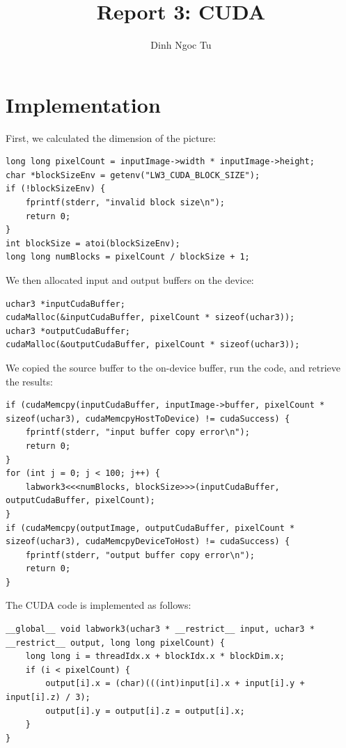 \documentclass[12pt]{article}
\title{Report 3: CUDA}
\author{Dinh Ngoc Tu}
\begin{document}
\maketitle


\section{Implementation}

First, we calculated the dimension of the picture:

\begin{lstlisting}[breaklines]
long long pixelCount = inputImage->width * inputImage->height;
char *blockSizeEnv = getenv("LW3_CUDA_BLOCK_SIZE");
if (!blockSizeEnv) {
    fprintf(stderr, "invalid block size\n");
    return 0;
}
int blockSize = atoi(blockSizeEnv);
long long numBlocks = pixelCount / blockSize + 1;
\end{lstlisting}

We then allocated input and output buffers on the device:
\begin{lstlisting}[breaklines]
uchar3 *inputCudaBuffer;
cudaMalloc(&inputCudaBuffer, pixelCount * sizeof(uchar3));
uchar3 *outputCudaBuffer;
cudaMalloc(&outputCudaBuffer, pixelCount * sizeof(uchar3));
\end{lstlisting}

We copied the source buffer to the on-device buffer, run the code, and retrieve the results:

\begin{lstlisting}[breaklines]
if (cudaMemcpy(inputCudaBuffer, inputImage->buffer, pixelCount * sizeof(uchar3), cudaMemcpyHostToDevice) != cudaSuccess) {
    fprintf(stderr, "input buffer copy error\n");
    return 0;
}
for (int j = 0; j < 100; j++) {
    labwork3<<<numBlocks, blockSize>>>(inputCudaBuffer, outputCudaBuffer, pixelCount);
}
if (cudaMemcpy(outputImage, outputCudaBuffer, pixelCount * sizeof(uchar3), cudaMemcpyDeviceToHost) != cudaSuccess) {
    fprintf(stderr, "output buffer copy error\n");
    return 0;
}
\end{lstlisting}

The CUDA code is implemented as follows:

\begin{lstlisting}[breaklines]
__global__ void labwork3(uchar3 * __restrict__ input, uchar3 * __restrict__ output, long long pixelCount) {
    long long i = threadIdx.x + blockIdx.x * blockDim.x;
    if (i < pixelCount) {
        output[i].x = (char)(((int)input[i].x + input[i].y + input[i].z) / 3);
        output[i].y = output[i].z = output[i].x;
    }
}
\end{lstlisting}
\end{document}
